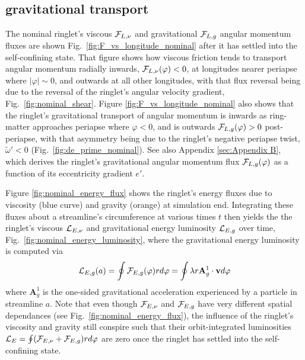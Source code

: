 \documentclass[preprint]{aastex62}
\begin{document}
\subsection{gravitational transport}
\label{subsec:gravitational_flux}

The nominal ringlet's viscous ${\cal F}_{L,\nu}$ and gravitational ${\cal F}_{L,g}$
angular momentum fluxes are shown Fig.\ \ref{fig:F_vs_longitude_nominal} after it has settled into the self-confining state. 
That figure shows how viscous friction tends to transport angular momentum radially inwards, ${\cal F}_{L,\nu}(\varphi)<0$, 
at longitudes nearer periapse where $|\varphi|\sim0$, and outwards
at all other longitudes, with that flux reversal being due to the
reversal of the ringlet's angular velocity gradient, Fig.\ \ref{fig:nominal_shear}. 
Figure \ref{fig:F_vs_longitude_nominal} also shows that the ringlet's gravitational
transport of angular momentum is inwards as
ring-matter approaches periapse where $\varphi<0$, 
and is outwards ${\cal F}_{L,g}(\varphi)>0$ post-periapse, with that asymmetry being due to the ringlet's
negative periapse twist, $\tilde{\omega}'<0$ (Fig.\ \ref{fig:de_prime_nominal}).
See also Appendix \ref{sec:Appendix B}, which derives the ringlet's gravitational angular momentum flux
${\cal F}_{L,g}(\varphi)$ as a function of its eccentricity gradient $e'$. 

Figure \ref{fig:nominal_energy_flux} shows the ringlet's energy fluxes 
due to viscosity (blue curve) and gravity (orange) at simulation end.
Integrating these fluxes about a streamline's circumference at various times $t$ then yields the
the ringlet's viscous ${\cal L}_{E,\nu}$ and gravitational energy luminosity ${\cal L}_{E,g}$ over time,
Fig.\ \ref{fig:nominal_energy_luminosity}, where the gravitational energy luminosity is computed via
\begin{equation}
    \label{eqn:L_g}
    {\cal L}_{E,g}(a) = \oint {\cal F}_{E,g}(\varphi)rd\varphi = \oint \lambda r\mathbf{A}^1_g\cdot\mathbf{v}d\varphi
\end{equation}
where $\mathbf{A}^1_g$ is the one-sided gravitational acceleration experienced by a particle in streamline $a$.
Note that even though ${\cal F}_{E,\nu}$ and ${\cal F}_{E,g}$ have very different spatial dependances 
(see Fig.\ \ref{fig:nominal_energy_flux}),
the influence of the ringlet's viscosity and gravity still conspire such that their
orbit-integrated luminosities ${\cal L}_{E}=\oint ({\cal F}_{E,\nu}+{\cal F}_{E,g})rd\varphi$ are zero 
once the ringlet has settled into the self-confining state.
\end{document}
